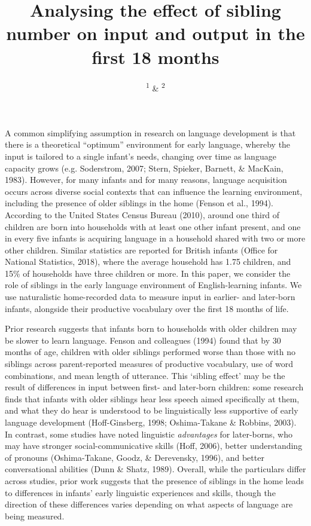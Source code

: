 \documentclass[
  man,mask,floatsintext]{apa6}
\title{Analysing the effect of sibling number on input and output in the first 18 months}
\author{\textsuperscript{1} \& \textsuperscript{2}}
\date{}
\affiliation{\vspace{0.5cm}\textsuperscript{1} \\\textsuperscript{2} }
\begin{document}
\maketitle

A common simplifying assumption in research on language development is that there is a theoretical ``optimum'' environment for early language, whereby the input is tailored to a single infant's needs, changing over time as language capacity grows (e.g. Soderstrom, 2007; Stern, Spieker, Barnett, \& MacKain, 1983). However, for many infants and for many reasons, language acquisition occurs across diverse social contexts that can influence the learning environment, including the presence of older siblings in the home (Fenson et al., 1994). According to the United States Census Bureau (2010), around one third of children are born into households with at least one other infant present, and one in every five infants is acquiring language in a household shared with two or more other children. Similar statistics are reported for British infants (Office for National Statistics, 2018), where the average household has 1.75 children, and 15\% of households have three children or more. In this paper, we consider the role of siblings in the early language environment of English-learning infants. We use naturalistic home-recorded data to measure input in earlier- and later-born infants, alongside their productive vocabulary over the first 18 months of life.

Prior research suggests that infants born to households with older children may be slower to learn language. Fenson and colleagues (1994) found that by 30 months of age, children with older siblings performed worse than those with no siblings across parent-reported measures of productive vocabulary, use of word combinations, and mean length of utterance. This `sibling effect' may be the result of differences in input between first- and later-born children: some research finds that infants with older siblings hear less speech aimed specifically at them, and what they do hear is understood to be linguistically less supportive of early language development (Hoff-Ginsberg, 1998; Oshima-Takane \& Robbins, 2003). In contrast, some studies have noted linguistic \emph{advantages} for later-borns, who may have stronger social-communicative skills (Hoff, 2006), better understanding of pronouns (Oshima-Takane, Goodz, \& Derevensky, 1996), and better conversational abilities (Dunn \& Shatz, 1989). Overall, while the particulars differ across studies, prior work suggests that the presence of siblings in the home leads to differences in infants' early linguistic experiences and skills, though the direction of these differences varies depending on what aspects of language are being measured.
\end{document}
